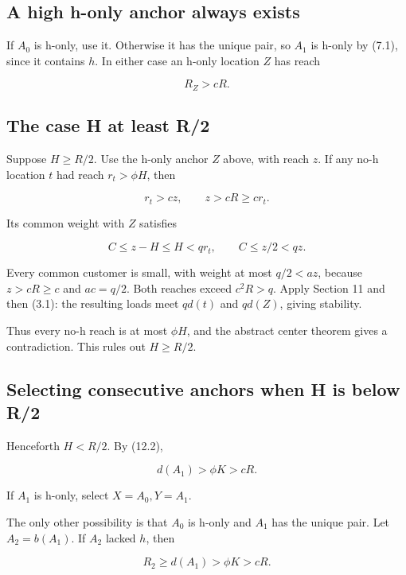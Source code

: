 \documentclass[11pt,a4paper]{article}
\begin{document}
\hypertarget{a-high-h-only-anchor-always-exists}{%
\subsection{A high h-only anchor always exists}\label{a-high-h-only-anchor-always-exists}}

If \(A_0\) is h-only, use it. Otherwise it has the unique pair, so \(A_1\) is h-only by (7.1), since it contains \(h\). In either case an h-only location \(Z\) has reach

\[
R_Z>cR. \tag{12.3}
\]

\hypertarget{the-case-h-at-least-r2}{%
\subsection{The case H at least R/2}\label{the-case-h-at-least-r2}}

Suppose \(H\ge R/2\). Use the h-only anchor \(Z\) above, with reach \(z\). If any no-h location \(t\) had reach \(r_t>\phi H\), then

\[
r_t>cz,\qquad z>cR\ge cr_t.
\]

Its common weight with \(Z\) satisfies

\[
C\le z-H\le H<qr_t,\qquad C\le z/2<qz.
\]

Every common customer is small, with weight at most \(q/2<a z\), because \(z>cR\ge c\) and \(ac=q/2\). Both reaches exceed \(c^2R>q\). Apply Section 11 and then (3.1): the resulting loads meet \(qd(t)\) and \(qd(Z)\), giving stability.

Thus every no-h reach is at most \(\phi H\), and the abstract center theorem gives a contradiction. This rules out \(H\ge R/2\).

\hypertarget{selecting-consecutive-anchors-when-h-is-below-r2}{%
\subsection{Selecting consecutive anchors when H is below R/2}\label{selecting-consecutive-anchors-when-h-is-below-r2}}

Henceforth \(H<R/2\). By (12.2),

\[
d(A_1)>\phi K>cR. \tag{12.4}
\]

If \(A_1\) is h-only, select \(X=A_0,Y=A_1\).

The only other possibility is that \(A_0\) is h-only and \(A_1\) has the unique pair. Let \(A_2=b(A_1)\). If \(A_2\) lacked \(h\), then

\[
R_2\ge d(A_1)>\phi K>cR.
\]
\end{document}
